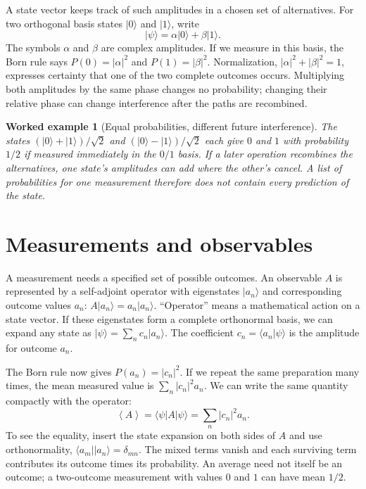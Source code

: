 \documentclass[11pt,oneside]{book}
\newcommand{\avg}[1]{\left\langle #1\right\rangle}
\newcommand{\ket}[1]{\lvert #1\rangle}
\newcommand{\bra}[1]{\langle #1\rvert}
\theoremstyle{reviewstyle}
\newtheorem{example}{Worked example}[chapter]
\begin{document}
A state vector keeps track of such amplitudes in a chosen set of alternatives. For two orthogonal basis states $\ket0$ and $\ket1$, write
\begin{equation}
\ket\psi=\alpha\ket0+\beta\ket1.
\end{equation}
The symbols $\alpha$ and $\beta$ are complex amplitudes. If we measure in this basis, the Born rule says $P(0)=|\alpha|^2$ and $P(1)=|\beta|^2$. Normalization, $|\alpha|^2+|\beta|^2=1$, expresses certainty that one of the two complete outcomes occurs. Multiplying both amplitudes by the same phase changes no probability; changing their relative phase can change interference after the paths are recombined.

\begin{example}[Equal probabilities, different future interference]
The states $(\ket0+\ket1)/\sqrt2$ and $(\ket0-\ket1)/\sqrt2$ each give $0$ and $1$ with probability $1/2$ if measured immediately in the $0/1$ basis. If a later operation recombines the alternatives, one state's amplitudes can add where the other's cancel. A list of probabilities for one measurement therefore does not contain every prediction of the state.
\end{example}

\section{Measurements and observables}
A measurement needs a specified set of possible outcomes. An observable $A$ is represented by a self-adjoint operator with eigenstates $\ket{a_n}$ and corresponding outcome values $a_n$: $A\ket{a_n}=a_n\ket{a_n}$. ``Operator'' means a mathematical action on a state vector. If these eigenstates form a complete orthonormal basis, we can expand any state as $\ket\psi=\sum_n c_n\ket{a_n}$. The coefficient $c_n=\bra{a_n}\psi\rangle$ is the amplitude for outcome $a_n$.

The Born rule now gives $P(a_n)=|c_n|^2$. If we repeat the same preparation many times, the mean measured value is $\sum_n|c_n|^2a_n$. We can write the same quantity compactly with the operator:
\begin{equation}
\avg A=\bra\psi A\ket\psi
=\sum_n|c_n|^2a_n.
\end{equation}
To see the equality, insert the state expansion on both sides of $A$ and use orthonormality, $\bra{a_m}\ket{a_n}=\delta_{mn}$. The mixed terms vanish and each surviving term contributes its outcome times its probability. An average need not itself be an outcome; a two-outcome measurement with values $0$ and $1$ can have mean $1/2$.
\end{document}

